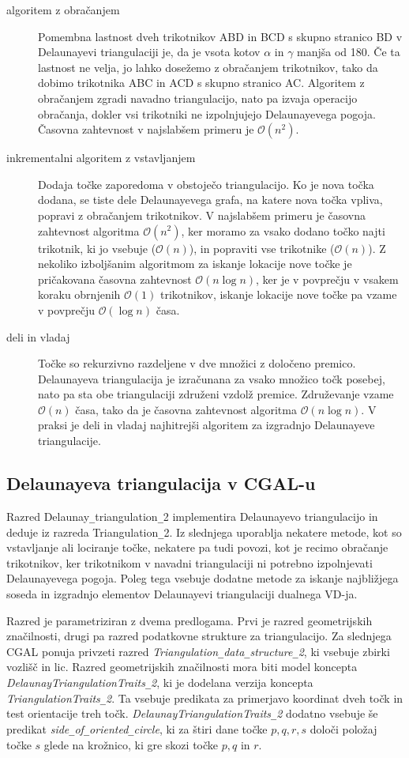\documentclass[a4paper, 12pt]{book}
\newcommand{\OO}{\ensuremath{\mathcal{O}}} %
\newcommand{\U}{\texttt{\_}}
\begin{document}
\begin{description}
\item[algoritem z obračanjem] Pomembna lastnost dveh trikotnikov ABD in BCD s skupno stranico BD v Delaunayevi triangulaciji je, da je vsota kotov $\alpha$ in $\gamma$ manjša od 180\textdegree. Če ta lastnost ne velja, jo lahko dosežemo z obračanjem trikotnikov, tako da dobimo trikotnika ABC in ACD s skupno stranico AC. Algoritem z obračanjem zgradi navadno triangulacijo, nato pa izvaja operacijo obračanja, dokler vsi trikotniki ne izpolnjujejo Delaunayevega pogoja. Časovna zahtevnost v najslabšem primeru je $\OO(n^2)$.
\item[inkrementalni algoritem z vstavljanjem] Dodaja točke zaporedoma v obstoječo triangulacijo. Ko je nova točka dodana, se tiste dele Delaunayevega grafa, na katere nova točka vpliva, popravi z obračanjem trikotnikov. V najslabšem primeru je časovna zahtevnost algoritma $\OO(n^2)$, ker moramo za vsako dodano točko najti trikotnik, ki jo vsebuje ($\OO(n)$), in popraviti vse trikotnike ($\OO(n)$). Z nekoliko izboljšanim algoritmom za iskanje lokacije nove točke je pričakovana časovna zahtevnost $\OO(n\log n)$, ker je v povprečju v vsakem koraku obrnjenih $\OO(1)$ trikotnikov, iskanje lokacije nove točke pa vzame v povprečju $\OO(\log n)$ časa.
\item[deli in vladaj] Točke so rekurzivno razdeljene v dve množici z določeno premico. Delaunayeva triangulacija je izračunana za vsako množico točk posebej, nato pa sta obe triangulaciji združeni vzdolž premice. Združevanje vzame $\OO(n)$ časa, tako da je časovna zahtevnost algoritma $\OO(n\log n)$. V praksi je deli in vladaj najhitrejši algoritem za izgradnjo Delaunayeve triangulacije.
\end{description}

\subsection{Delaunayeva triangulacija v CGAL-u}
Razred Delaunay\U triangulation\U 2 implementira Delaunayevo triangulacijo in deduje iz razreda Triangulation\U 2. Iz slednjega uporablja nekatere metode, kot so vstavljanje ali lociranje točke, nekatere pa tudi povozi, kot je recimo obračanje trikotnikov, ker trikotnikom v navadni triangulaciji ni potrebno izpolnjevati Delaunayevega pogoja. Poleg tega vsebuje dodatne metode za iskanje najbližjega soseda in izgradnjo elementov Delaunayevi triangulaciji dualnega VD-ja.

Razred je parametriziran z dvema predlogama. Prvi je razred geometrijskih značilnosti, drugi pa razred podatkovne strukture za triangulacijo. Za slednjega CGAL ponuja privzeti razred \textit{ Triangulation\U data\U structure\U 2}, ki vsebuje zbirki vozlišč in lic. Razred geometrijskih značilnosti mora biti model koncepta \textit{DelaunayTriangulationTraits\U 2}, ki je dodelana verzija koncepta \textit{TriangulationTraits\U 2}. Ta vsebuje predikata za primerjavo koordinat dveh točk in test orientacije treh točk. \textit{DelaunayTriangulationTraits\U 2} dodatno vsebuje še predikat \textit{side\U of\U oriented\U circle}, ki za štiri dane točke $p, q, r, s$ določi položaj točke $s$ glede na krožnico, ki gre skozi točke $p, q$ in $r$.
\end{document}
